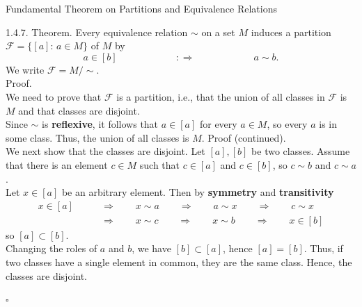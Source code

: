 \documentclass[smaller,hyperref={CJKbookmarks=true}]{beamer}
\begin{document}
\begin{frame}{{\large Fundamental Theorem on Partitions and Equivalence Relations}}
\begin{spacing}{1.1}
\vspace*{9pt}
\alert{1.4.7. Theorem.} Every equivalence relation $\sim$ on a set $M$ induces a partition $\mathcal{F}=\{[a]\!:\,a\in M\}$ of $M$ by
\begin{equation}\label{1.4.3}
a\in[b]\qquad\qquad\qquad:\Rightarrow\qquad
\qquad\qquad a\sim b.
\end{equation}
We write $\mathcal{F}=M/\sim.$\\[7pt]
\alert{Proof.}\\
We need to prove that $\mathcal{F}$ is a partition, i.e., that the union of all classes in $\mathcal{F}$ is $M$ and that classes are disjoint.\\[6pt]
Since $\sim$ is \textbf{reflexive}, it follows that $a\in[a]$ for every $a\in M$, so every $a$ is in some class. Thus, the union of all classes is $M$.
\newpage
\alert{Proof (continued).}\\
We next show that the classes are disjoint. Let $[a],[b]$ be two classes. Assume that there is an element $c\in M$ such that $c\in[a]$ and $c\in[b]$, so $c\sim b$ and $c\sim a$.\\[6pt]
Let $x\in[a]$ be an arbitrary element. Then by \textbf{symmetry} and \textbf{transitivity}
\begin{equation*}
  \begin{split}
     x\in[a]\qquad &\Rightarrow\qquad x\sim a\qquad\Rightarrow\qquad a\sim x\qquad\Rightarrow\qquad c\sim x \\
       &\Rightarrow\qquad x\sim c\qquad\Rightarrow\qquad x\sim b\qquad\Rightarrow\qquad x\in[b]
  \end{split}
\end{equation*}
so $[a]\subset [b]$.\\[4pt]
Changing the roles of $a$ and $b$, we have $[b]\subset[a]$, hence $[a]=[b]$. Thus, if two classes have a single element in common, they are the same class. Hence, the classes are disjoint.
\begin{flushright}
  $\square$
\end{flushright}
\end{spacing}
\end{frame}
\end{document}
